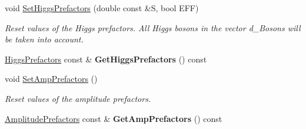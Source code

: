 \begin{DoxyCompactItemize}
\item 
void \hyperlink{classHiggsModel_a43f6951291eef31cc18116f7d49f839f}{Set\+Higgs\+Prefactors} (double const \&S, bool E\+F\+F)
\begin{DoxyCompactList}\small\item\em Reset values of the Higgs prefactors. All Higgs bosons in the vector d\+\_\+\+Bosons will be taken into account. \end{DoxyCompactList}\item 
\hypertarget{classHiggsModel_a36b052bac528028a1757554d45901513}{}\hyperlink{structHiggsPrefactors}{Higgs\+Prefactors} const \& {\bfseries Get\+Higgs\+Prefactors} () const \label{classHiggsModel_a36b052bac528028a1757554d45901513}

\item 
\hypertarget{classHiggsModel_a514e3dd7854409c622b8e200fe2ee84c}{}void \hyperlink{classHiggsModel_a514e3dd7854409c622b8e200fe2ee84c}{Set\+Amp\+Prefactors} ()\label{classHiggsModel_a514e3dd7854409c622b8e200fe2ee84c}

\begin{DoxyCompactList}\small\item\em Reset values of the amplitude prefactors. \end{DoxyCompactList}\item 
\hypertarget{classHiggsModel_a77b35a425c80b8d9006354670f91acca}{}\hyperlink{structAmplitudePrefactors}{Amplitude\+Prefactors} const \& {\bfseries Get\+Amp\+Prefactors} () const \label{classHiggsModel_a77b35a425c80b8d9006354670f91acca}


\end{DoxyCompactItemize}

